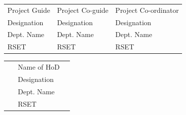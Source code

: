 \begin{flushleft}
	
	
	\begin{longtable}{p{5.8cm} p{5.8cm} p{5.8cm}}
		{Project Guide}& {Project Co-guide} & {Project Co-ordinator}\\
		{Designation}& {Designation} & {Designation}\\
		{Dept. Name}&  {Dept. Name} & {Dept. Name}\\
		{RSET} ~&{RSET} & {RSET} \\
		
	\end{longtable}
\end{flushleft}
	
	\vspace{2cm}

\begin{flushleft}
	
	
	\begin{longtable}{p{5.8cm} p{5.8cm} p{5.8cm}}
		{}& {Name of HoD} & {}\\
		{}& {Designation} & {}\\
		{}&  {Dept. Name} & {}\\
		{} ~&{RSET} & {} \\
		
	\end{longtable}
\end{flushleft}


%	
%	
%		

